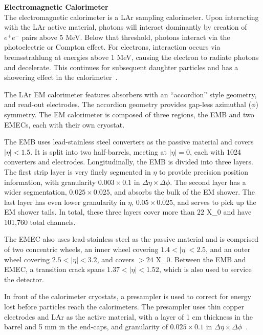\noindent\textbf{Electromagnetic Calorimeter}\\
\indent The electromagnetic calorimeter is a \gls{LAr} sampling calorimeter. Upon interacting with the \gls{LAr} active material, photons will interact dominantly by creation of $e^+e^-$ pairs above 5 MeV. Below that threshold, photons interact via the photoelectric or Compton effect. For electrons, interaction occurs via bremsstrahlung at energies above 1 MeV, causing the electron to radiate photons and decelerate. This continues for subsequent daughter particles and has a showering effect in the calorimeter~\cite{detectors-for-radiation}.

The \gls{LAr} \gls{EM} calorimeter features absorbers with an ``accordion'' style geometry, and read-out electrodes. The accordion geometry provides gap-less azimuthal ($\phi$) symmetry. The \gls{EM} calorimeter is composed of three regions, the \gls{EMB} and two \glspl{EMEC}, each with their own cryostat.

The \gls{EMB} uses lead-stainless steel converters as the passive material and covers $|\eta| < 1.5$. It is split into two half-barrels, meeting at $|\eta| = 0$, each with 1024 converters and electrodes. Longitudinally, the \gls{EMB} is divided into three layers. The first strip layer is very finely segmented in $\eta$ to provide precision position information, with granularity $0.003 \times 0.1$ in $\Delta\eta \times \Delta \phi$. The second layer has a wider segmentation, $0.025 \times 0.025$, and absorbs the bulk of the \gls{EM} shower. The last layer has even lower granularity in $\eta$, $0.05 \times 0.025$, and serves to pick up the \gls{EM} shower tails. In total, these three layers cover more than $22$ \gls{X_0} and have 101,760 total channels.

The \gls{EMEC} also uses lead-stainless steel as the passive material and is comprised of two concentric wheels, an inner wheel covering $1.4 < |\eta| < 2.5$, and an outer wheel covering $2.5 < |\eta| < 3.2$, and covers $>24$ \gls{X_0}. Between the \gls{EMB} and \gls{EMEC}, a transition crack spans $1.37 < |\eta| < 1.52$, which is also used to service the detector.

In front of the calorimeter cryostats, a presampler is used to correct for energy lost before particles reach the calorimeters. The presampler uses thin copper electrodes and \gls{LAr} as the active material, with a layer of 1 cm thickness in the barrel and 5 mm in the end-caps, and granularity of $0.025 \times 0.1$ in $\Delta\eta \times \Delta \phi$~\cite{lar-tdr}.


